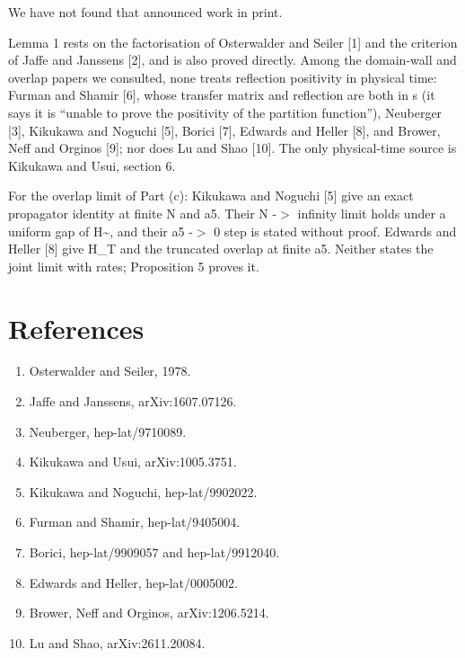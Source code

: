 \documentclass[11pt,a4paper]{article}
\begin{document}
We have not found that announced work in print.

Lemma 1 rests on the factorisation of Osterwalder and Seiler [1] and the criterion of Jaffe and Janssens [2], and is also proved directly. Among the domain-wall and overlap papers we consulted, none treats reflection positivity in physical time: Furman and Shamir [6], whose transfer matrix and reflection are both in s (it says it is ``unable to prove the positivity of the partition function''), Neuberger [3], Kikukawa and Noguchi [5], Borici [7], Edwards and Heller [8], and Brower, Neff and Orginos [9]; nor does Lu and Shao [10]. The only physical-time source is Kikukawa and Usui, section 6.

For the overlap limit of Part (c): Kikukawa and Noguchi [5] give an exact propagator identity at finite N and a5. Their N -$>$ infinity limit holds under a uniform gap of H\textasciitilde{}, and their a5 -$>$ 0 step is stated without proof. Edwards and Heller [8] give H\_T and the truncated overlap at finite a5. Neither states the joint limit with rates; Proposition 5 proves it.


\section*{References}
\begin{enumerate}
\item{} Osterwalder and Seiler, 1978.
\item{} Jaffe and Janssens, arXiv:1607.07126.
\item{} Neuberger, hep-lat/9710089.
\item{} Kikukawa and Usui, arXiv:1005.3751.
\item{} Kikukawa and Noguchi, hep-lat/9902022.
\item{} Furman and Shamir, hep-lat/9405004.
\item{} Borici, hep-lat/9909057 and hep-lat/9912040.
\item{} Edwards and Heller, hep-lat/0005002.
\item{} Brower, Neff and Orginos, arXiv:1206.5214.
\item{} Lu and Shao, arXiv:2611.20084.
\end{enumerate}
\end{document}

